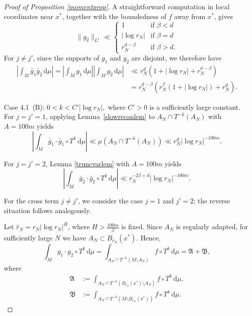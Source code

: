 \documentclass[11pt,twoside,a4paper,reqno]{amsart}
\renewcommand{\d}{\, \text{d}}
\begin{document}
\begin{proof}[Proof of Proposition \ref{momentprop}]
A straightforward computation in local coordinates near $x^*$, together with the boundedness of $f$ away from $x^*$, gives
\begin{equation*}
\|g_2\|_{L^1}\ll \begin{cases}
1 & \text{if } \beta<d\\
|\log r_N| & \text{if } \beta=d\\
r_N^{d-\beta} & \text{if } \beta>d.
\end{cases}
\end{equation*}
For $j\neq j'$, since the supports of $g_1$ and $g_2$ are disjoint, we therefore have
\begin{align*}
\left|\int_M \bar g_1\bar g_2\d\mu\right|=\left|\int_M g_1\d\mu\right|\left|\int_M g_2\d\mu\right|
&\ll r_N^{d}\left(1+|\log r_N|+r_N^{d-\beta}\right)\\
&=r_N^{d-\beta} \left(r_N^{\beta}(1+|\log r_N|) + r_N^d\right).
\end{align*}






Case 4.1~(B): $0<k<C' \left|\log r_N \right|,$ where $C'>0$ is a sufficiently large constant. For $j=j'=1$, applying Lemma~\ref{slowrecanlem} to $A_N \cap T^{-k}(A_N)$ with $A=100m$ yields
\begin{equation*}
\left|\int_M \bar{g}_1 \cdot \bar{g}_1 \circ T^{k} \d\mu\right|\ll \mu\left(A_N \cap T^{-k}(A_N)\right)
\ll r_N^d \left|\log r_N \right|^{-100m}.
\end{equation*}

For $j=j'=2$, Lemma \ref{truncvarlem} with $A=100m$ yields
\begin{equation}
\left| \int_M \bar{g}_2 \cdot \bar{g}_2 \circ T^k \d\mu \right| \ll r_N^{-2\beta+d} |\log r_N|^{-100m}.
\end{equation}

For the cross term $j\neq j'$, we consider the case $j=1$ and $j'=2$;
the reverse situation follows analogously.

Let $\hat{r}_N=r_N|\log r_N|^H$, where $H>\frac{100m}{\beta}$ is fixed. Since $A_N$ is regularly adapted, for sufficiently large $N$ we have $A_N\subset B_{\hat{r}_N}(x^*)$. Hence,
\begin{equation*}
\int_M g_1\cdot g_2\circ T^k\d\mu
=
\int_{A_N\cap T^{-k}(M\setminus A_N)}f\circ T^k\d\mu
=
\mathfrak A+\mathfrak B,
\end{equation*}
where
\begin{align*}
\mathfrak A&:=
\int_{A_N\cap T^{-k}(B_{\hat{r}_N}(x^*)\setminus A_N)}
f\circ T^k\d\mu,\\
\mathfrak B&:=
\int_{A_N\cap T^{-k}(M\setminus B_{\hat{r}_N}(x^*))}
f\circ T^k\d\mu .
\end{align*}


\end{proof}
\end{document}

